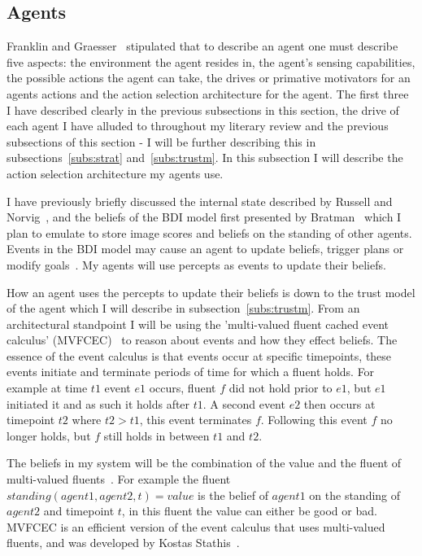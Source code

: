 \documentclass[]{final_report}
\begin{document}
\subsection{Agents}
Franklin and Graesser~\cite{franklin1996agent} stipulated that to describe an agent one must describe five aspects: the environment the agent resides in, the agent's sensing capabilities, the possible actions the agent can take, the drives or primative motivators for an agents actions and the action selection architecture for the agent. The first three I have described clearly in the previous subsections in this section, the drive of each agent I have alluded to throughout my literary review and the previous subsections of this section - I will be further describing this in subsections~\ref{subs:strat} and~\ref{subs:trustm}. In this subsection I will describe the action selection architecture my agents use.\par
I have previously briefly discussed the internal state described by Russell and Norvig~\cite{russell2016artificial}, and the beliefs of the BDI model first presented by Bratman~\cite{bratman1987intention} which I plan to emulate to store image scores and beliefs on the standing of other agents. Events in the BDI model may cause an agent to update beliefs, trigger plans or modify goals~\cite{kostas_deductive}. My agents will use percepts as events to update their beliefs.\par
How an agent uses the percepts to update their beliefs is down to the trust model of the agent which I will describe in subsection~\ref{subs:trustm}. From an architectural standpoint I will be using the 'multi-valued fluent cached event calculus' (MVFCEC)~\cite{mvfcec} to reason about events and how they effect beliefs. The essence of the event calculus is that events occur at specific timepoints, these events initiate and terminate periods of time for which a fluent holds. For example at time $t1$ event $e1$ occurs, fluent $f$ did not hold prior to $e1$, but $e1$ initiated it and as such it holds after $t1$. A second event $e2$ then occurs at timepoint $t2$ where $t2>t1$, this event terminates $f$. Following this event $f$ no longer holds, but $f$ still holds in between $t1$ and $t2$.\par
The beliefs in my system will be the combination of the value and the fluent of multi-valued fluents~\cite{artikis2009specifying}. For example the fluent $standing(agent1, agent2, t)=value$ is the belief of $agent1$ on the standing of $agent2$ and timepoint $t$, in this fluent the value can either be good or bad. MVFCEC is an efficient version of the event calculus that uses multi-valued fluents, and was developed by Kostas Stathis~\cite{mvfcec}.\par
\end{document}
